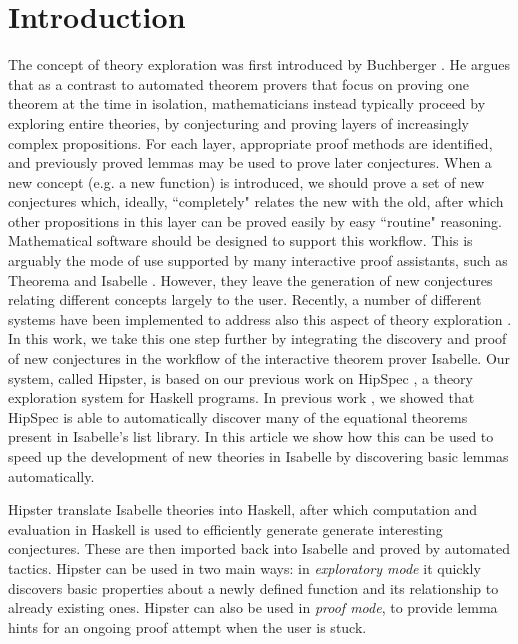 \section{Introduction}
\label{sec:intro}
The concept of theory exploration was first introduced by Buchberger \cite{buchberger2000theory}. He argues that as a contrast to  automated theorem provers that focus on proving one theorem at the time in isolation, mathematicians instead typically proceed by exploring entire theories, by conjecturing and proving layers of increasingly complex propositions. For each layer, appropriate proof methods are identified, and previously proved lemmas may be used to prove later conjectures. When a new concept (e.g. a new function) is introduced, we should prove a set of new conjectures which, ideally, ``completely" relates the new with the old, after which other propositions in this layer can be proved easily by easy ``routine" reasoning. Mathematical software should be designed to support this workflow. This is arguably the mode of use supported by many interactive proof assistants, such as Theorema \cite{theorema} and Isabelle \cite{isabelle}. However, they leave the generation of new conjectures relating different concepts largely to the user. Recently, a number of different systems have been implemented to address also this aspect of theory exploration \cite{McCasland2006,isacosy,isascheme,hipspecCADE}.  In this work, we take this one step further by integrating the discovery and proof of new conjectures in the workflow of the interactive theorem prover Isabelle. Our system, called Hipster, is based on our previous work on HipSpec \cite{hipspecCADE}, a theory exploration system for Haskell programs. In previous work \cite{hipspecCADE}, we showed that HipSpec is able to automatically discover many of the equational theorems present in Isabelle's list library. In this article we show how this can be used to speed up the development of new theories in Isabelle by discovering basic lemmas automatically. 

Hipster translate Isabelle theories into Haskell, after which computation and evaluation in Haskell is used to efficiently generate generate interesting conjectures. These are then imported back into Isabelle and proved by automated tactics. Hipster can be used in two main ways: in \emph{exploratory mode} it quickly discovers basic properties about a newly defined function and its relationship to already existing ones. Hipster can also be used in \emph{proof mode}, to provide lemma hints for an ongoing proof attempt when the user is stuck. 

